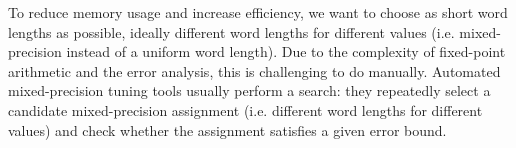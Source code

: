 To reduce memory usage and increase efficiency, we want to choose as short word
lengths as possible, ideally different word lengths for different values (i.e.
mixed-precision instead of a uniform word length). Due to the complexity of
fixed-point arithmetic and the error analysis, this is challenging to do
manually.
Automated mixed-precision tuning tools usually perform a search: they repeatedly
select a candidate mixed-precision assignment (i.e. different word lengths for
different values) and check whether the assignment satisfies a given error
bound.